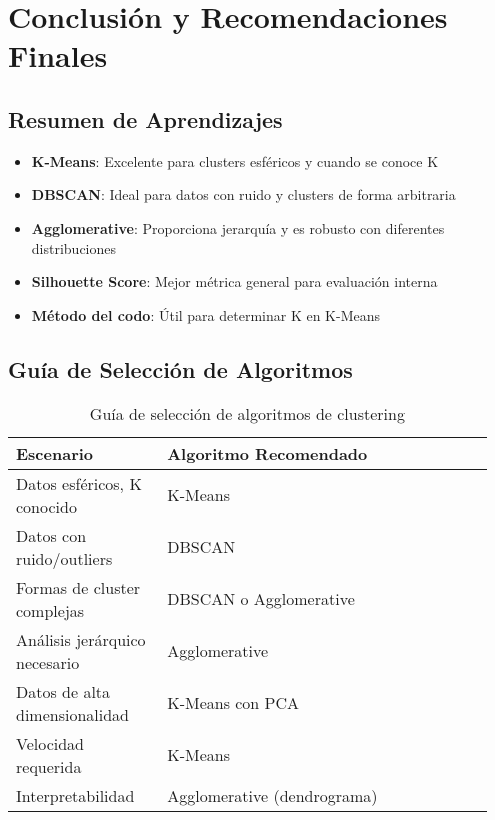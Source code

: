 \documentclass[12pt]{article}
\begin{document}
\section{Conclusión y Recomendaciones Finales}

\subsection{Resumen de Aprendizajes}
\begin{itemize}
\item \textbf{K-Means}: Excelente para clusters esféricos y cuando se conoce K
\item \textbf{DBSCAN}: Ideal para datos con ruido y clusters de forma arbitraria  
\item \textbf{Agglomerative}: Proporciona jerarquía y es robusto con diferentes distribuciones
\item \textbf{Silhouette Score}: Mejor métrica general para evaluación interna
\item \textbf{Método del codo}: Útil para determinar K en K-Means
\end{itemize}

\subsection{Guía de Selección de Algoritmos}
\begin{table}[H]
\centering
\begin{tabular}{p{0.3\linewidth}p{0.65\linewidth}}
\toprule
\textbf{Escenario} & \textbf{Algoritmo Recomendado} \\
\midrule
Datos esféricos, K conocido & K-Means \\
Datos con ruido/outliers & DBSCAN \\
Formas de cluster complejas & DBSCAN o Agglomerative \\
Análisis jerárquico necesario & Agglomerative \\
Datos de alta dimensionalidad & K-Means con PCA \\
Velocidad requerida & K-Means \\
Interpretabilidad & Agglomerative (dendrograma) \\
\bottomrule
\end{tabular}
\caption{Guía de selección de algoritmos de clustering}
\end{table}
\end{document}
